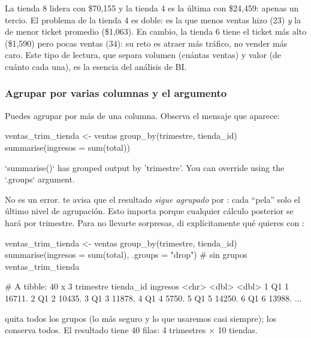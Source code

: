 La tienda 8 lidera con \$70,155 y la tienda 4 es la última con \$24,459:
apenas un tercio. El problema de la tienda 4 es doble: es la que menos
ventas hizo (23) \emph{y} la de menor ticket promedio (\$1,063). En cambio,
la tienda 6 tiene el ticket más alto (\$1,590) pero pocas ventas (34): su
reto es atraer más tráfico, no vender más caro. Este tipo de lectura, que
separa volumen (cuántas ventas) y valor (de cuánto cada una), es la esencia
del análisis de BI.

\subsubsection{Agrupar por varias columnas y el argumento \texorpdfstring{}{.groups}}

Puedes agrupar por más de una columna. Observa el mensaje que aparece:

\begin{rcode}
ventas_trim_tienda <- ventas %
  group_by(trimestre, tienda_id) %
  summarise(ingresos = sum(total))
\end{rcode}
\begin{rsalida}
`summarise()` has grouped output by 'trimestre'. You can override
using the `.groups` argument.
\end{rsalida}

No es un error.  te avisa que el resultado \emph{sigue
agrupado} por : cada  ``pela'' solo el
último nivel de agrupación. Esto importa porque cualquier cálculo posterior
se hará por trimestre. Para no llevarte sorpresas, di explícitamente qué
quieres con :

\begin{rcode}
ventas_trim_tienda <- ventas %
  group_by(trimestre, tienda_id) %
  summarise(ingresos = sum(total), .groups = "drop")  # sin grupos
ventas_trim_tienda
\end{rcode}
\begin{rsalida}
# A tibble: 40 x 3
   trimestre tienda_id ingresos
   <chr>         <dbl>    <dbl>
 1 Q1                1   16711.
 2 Q1                2   10435.
 3 Q1                3   11878.
 4 Q1                4    5750.
 5 Q1                5   14250.
 6 Q1                6   13988.
...
\end{rsalida}

 quita todos los grupos (lo más seguro y lo que
usaremos casi siempre);  los conserva todos. El
resultado tiene 40 filas: 4 trimestres $\times$ 10 tiendas.

